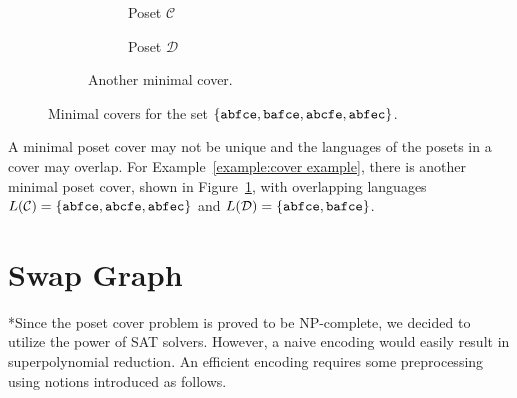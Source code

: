 \documentclass[12pt]{llncs}
\DeclarePairedDelimiter{\set}{\{}{\}}
\newcommand{\poset}[1]{\mathcal{#1}}
\newcommand{\lang}[1]{L(#1)}
\newcommand{\lin}[1]{\texttt{#1}}
\begin{document}
\begin{figure}
\begin{subfigure}[b]{0.5\textwidth}
\begin{subfigure}[b]{0.4\textwidth}
            \caption*{Poset $\poset{C}$}
        \end{subfigure}%
        \begin{subfigure}[b]{0.4\textwidth}
            \centering
            \caption*{Poset $\poset{D}$}
        \end{subfigure}
        \caption{Another minimal cover.}
        \label{figure:cover example c'}
    \end{subfigure}
    \caption{Minimal covers for the set $\set{\lin{abfce},\lin{bafce},\lin{abcfe},\lin{abfec}}$.}
    \label{figure:cover example}
\end{figure}

A minimal poset cover may not be unique and the languages of the posets in a cover may overlap. For Example~\ref{example:cover example}, there is another minimal poset cover, shown in Figure~\ref{figure:cover example c'}, with overlapping languages ${\lang{\poset{C}} = \set{\lin{abfce},\lin{abcfe},\lin{abfec}}}$ and ${\lang{\poset{D}} = \set{\lin{abfce},\lin{bafce}}}$.

\section{Swap Graph}
*Since the poset cover problem is proved to be NP-complete, we decided to utilize the power of SAT solvers. However, a naive encoding would easily result in superpolynomial reduction. An efficient encoding requires some preprocessing using notions introduced as follows.
\end{document}
